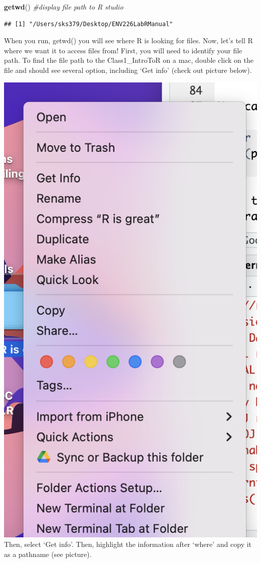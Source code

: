 \documentclass[
]{book}
\newenvironment{Shaded}{\begin{snugshade}}{\end{snugshade}}
\newcommand{\CommentTok}[1]{\textcolor[rgb]{0.56,0.35,0.01}{\textit{#1}}}
\newcommand{\FunctionTok}[1]{\textcolor[rgb]{0.13,0.29,0.53}{\textbf{#1}}}
\newcommand{\NormalTok}[1]{#1}
\begin{document}
\begin{Shaded}
\begin{Highlighting}[]
\FunctionTok{getwd}\NormalTok{() }\CommentTok{\#display file path to R studio }
\end{Highlighting}
\end{Shaded}

\begin{verbatim}
## [1] "/Users/sks379/Desktop/ENV226LabRManual"
\end{verbatim}

When you run, getwd() you will see where R is looking for files. Now, let's tell R where we want it to access files from! First, you will need to identify your file path. To find the file path to the Class1\_IntroToR on a mac, double click on the file and should see several option, including `Get info' (check out picture below).

\includegraphics{images:/01-intro/workingdirectorymac.png}
Then, select `Get info'. Then, highlight the information after `where' and copy it as a pathname (see picture).
\end{document}
